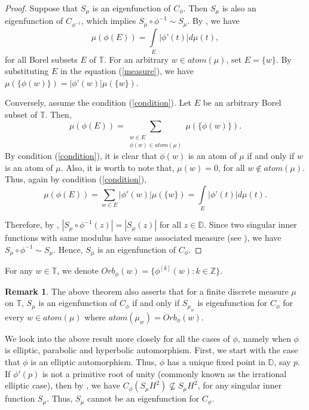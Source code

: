 \documentclass[12pt, reqno]{amsart}
\theoremstyle{definition}
\newtheorem{remark}[theorem]{Remark}
\numberwithin{equation}{section}
\begin{document}
\begin{proof}
Suppose that  $S_\mu$ is an eigenfunction of $C_\phi$.  Then   $S_\mu$ is also an eigenfunction of $C_{\phi^{-1}}$, which implies $S_\mu\circ \phi^{-1}\sim S_\mu$. 
 By \cite[Lemma 3.6]{orbits}, we have 
\begin{equation}\label{measure}
	\mu(\phi(E))=\int\limits_{E}|\phi’(t)|d\mu(t),
\end{equation}
for all Borel subsets $E$ of $\mathbb{T}$. For an arbitrary $w \in atom(\mu)$, set $E=\{w\}$. By substituting $E$ in the equation (\ref{measure}), we have
$\mu(\{\phi(w)\})=|\phi’(w)|\mu(\{w\})$.
	
	Conversely, assume  the condition (\ref{condition}). Let $E$ be an arbitrary Borel subset of $\mathbb{T}$. Then,
$$\mu(\phi(E))=\sum_{\substack{w\in E\\\phi(w)\in atom(\mu)}}\mu(\{\phi(w)\}).$$
By condition (\ref{condition}), it is clear that $\phi(w)$ is an atom of $\mu$ if and only if $w$ is an atom of $\mu$. Also, it is worth to note that, $\mu(w)=0$, for all $w \notin atom(\mu)$. Thus, again by condition (\ref{condition}), $$\mu(\phi(E))=\sum_{w\in E}|\phi'(w)|\mu(\{w\})=\int\limits_{E}|\phi’(t)|d\mu(t).$$

	
Therefore, by \cite[Lemma 3.6]{orbits}, $|S_\mu\circ \phi^{-1}(z)|= |S_\mu(z)|$ for all $z \in \mathbb{D}$. Since two singular inner functions with same modulus have same associated measure (see \cite[Page~71]{garnett}), we have $S_\mu\circ \phi^{-1}\sim S_\mu$. Hence, $S_\mu$ is an eigenfunction  of $C_\phi$.
\end{proof} 
For any $w \in \mathbb{T}$, we denote  $Orb_\phi(w)=\{\phi^{[k]}(w):k\in \mathbb{Z}\}$.
\begin{remark}
	The above theorem also asserts that for a finite discrete  measure $\mu$ on $\mathbb{T}$, $S_\mu$ is an eigenfunction of $C_\phi$  if and only if $S_{\mu_{w}}$ is eigenfunction for $C_\phi$ for every $w\in atom(\mu) $ where $atom(\mu_{w})=Orb_\phi(w)$.
\end{remark}
We look into the above result more closely for all the cases of $\phi$, namely when $\phi$ is elliptic, parabolic and hyperbolic automorphism. First, we start with the case that $\phi$ is an elliptic automorphism. Thus, $\phi$ has a unique fixed point in $\mathbb{D}$, say $p$.
     If $\phi'(p)$ is not a primitive root of unity (commonly known as the irrational elliptic case), then by \cite[Theorem 2]{jones}, we have $C_\phi(S_\mu H^2)\nsubseteq S_\mu H^2$, for any singular inner function  $S_\mu$. Thus, $S_\mu$ cannot be an eigenfunction  for $C_\phi$. 
     
\end{document}
